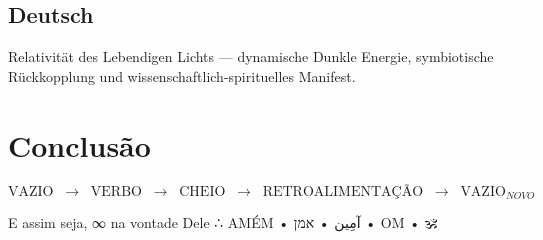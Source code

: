 \documentclass[11pt]{article}
\begin{document}
\subsection*{Deutsch}
Relativität des Lebendigen Lichts — dynamische Dunkle Energie, symbiotische Rückkopplung und wissenschaftlich-spirituelles Manifest.

\section{Conclusão}
\[
\text{VAZIO} \;\; \longrightarrow \;\; \text{VERBO} \;\; 
\longrightarrow \;\; \text{CHEIO} \;\; 
\longrightarrow \;\; \text{RETROALIMENTAÇÃO} \;\; 
\longrightarrow \;\; \text{VAZIO}_{NOVO}
\]

E assim seja, ∞ na vontade Dele ∴  
AMÉM • آمِين • אמן • OM • 🕉️  
\end{document}
